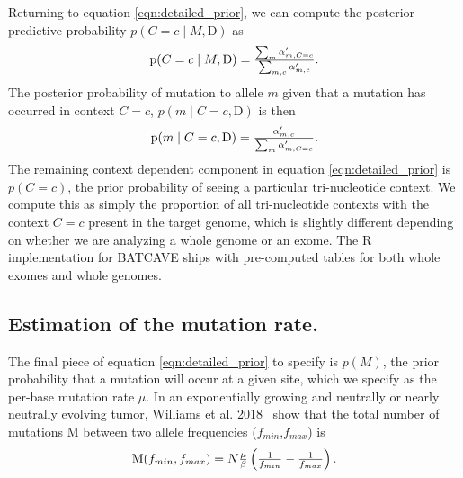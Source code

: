 \documentclass[a4,center,fleqn]{NAR}
\newcommand{\batcave}{BATCAVE }
\begin{document}
Returning to equation \ref{eqn:detailed_prior}, we can compute the posterior predictive probability $p(C = c \mid M,\mathrm{D})$ as
\begin{equation}
  \label{eqn:post_pred}
  $$
  \mathrm{p}(C = c \mid M,\mathrm{D}) = \frac{\sum_{m}\alpha^{\prime}_{m,C = c}}{\sum_{m,c}\alpha^{\prime}_{m,c}}.
  $$
\end{equation}
The posterior probability of mutation to allele $m$ given that a mutation has occurred in context $C = c$, $p(m  \mid C = c,\mathrm{D})$ is then
\begin{equation}
  \label{eqn:to_allele}
  $$
   \mathrm{p}(m \mid C = c,\mathrm{D}) = \frac{\alpha^{\prime}_{m,c}}{\sum_{m} \alpha^{\prime}_{m,C = c}}.
  $$
\end{equation}
The remaining context dependent component in equation \ref{eqn:detailed_prior} is $p(C = c)$, the prior probability of seeing a particular tri-nucleotide context.
We compute this as simply the proportion of all tri-nucleotide contexts with the context $C = c$ present in the target genome, which is slightly different depending on whether we are analyzing a whole genome or an exome.
The R implementation for \batcave ships with pre-computed tables for both whole exomes and whole genomes.

\subsection{Estimation of the mutation rate.}
The final piece of equation \ref{eqn:detailed_prior} to specify is $p(M)$, the prior probability that a mutation will occur at a given site, which we specify as the per-base mutation rate $\mu$.
In an exponentially growing and neutrally or nearly neutrally evolving tumor, Williams et al. 2018~\citep{Williams2018} show that the total number of mutations $\mathrm{M}$ between two allele frequencies ($f_{min}$,$f_{max}$) is
\begin{equation}
  \label{eqn:mut_rate}
$$
  \mathrm{M}(f_{min},f_{max}) = N\frac{\mu}{\beta}\left(\frac{1}{f_{min}} - \frac{1}{f_{max}}\right).
$$
\end{equation}
\end{document}
